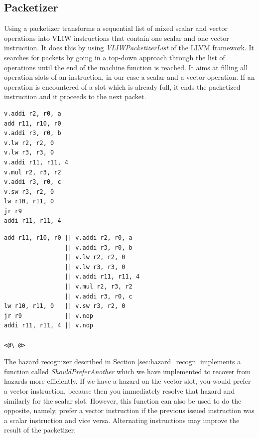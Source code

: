 \subsection{Packetizer}
Using a packetizer transforms a sequential list of mixed scalar and vector operations into VLIW instructions that contain one scalar and one vector instruction. It does this by using \emph{VLIWPacketizerList} of the LLVM framework. %
It searches for packets by going in a top-down approach through the list of operations until the end of the machine function is reached. It aims at filling all operation slots of an instruction, in our case a scalar and a vector operation. If an operation is encountered of a slot which is already full, it ends the packetized instruction and it proceeds to the next packet. 


\lstset{style=customasm}
\begin{center}
\hspace{2px}\begin{minipage}{.475\textwidth}
\begin{lstlisting}[frame=tlrb]
v.addi r2, r0, a
add r11, r10, r0
v.addi r3, r0, b
v.lw r2, r2, 0
v.lw r3, r3, 0
v.addi r11, r11, 4
v.mul r2, r3, r2
v.addi r3, r0, c
v.sw r3, r2, 0
lw r10, r11, 0
jr r9
addi r11, r11, 4
\end{lstlisting}
\end{minipage}\hfill
\begin{minipage}{.475\textwidth}
\begin{lstlisting}[frame=tlrb]
add r11, r10, r0 || v.addi r2, r0, a
                 || v.addi r3, r0, b
                 || v.lw r2, r2, 0
                 || v.lw r3, r3, 0
                 || v.addi r11, r11, 4
                 || v.mul r2, r3, r2
                 || v.addi r3, r0, c
lw r10, r11, 0   || v.sw r3, r2, 0
jr r9            || v.nop
addi r11, r11, 4 || v.nop

<@\ @>
\end{lstlisting}
\end{minipage}
\end{center}

The hazard recognizer described in Section \ref{sec:hazard_recogn} implements a function called \emph{ShouldPreferAnother} which we have implemented to recover from hazards more efficiently. If we have a hazard on the vector slot, you would prefer a vector instruction, because then you immediately resolve that hazard and similarly for the scalar slot. However, this function can also be used to do the opposite, namely, prefer a vector instruction if the previous issued instruction was a scalar instruction and vice versa. Alternating instructions may improve the result of the packetizer. 

